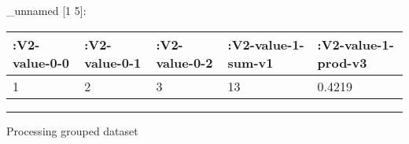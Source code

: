 \documentclass[]{article}
\newenvironment{Shaded}{\begin{snugshade}}{\end{snugshade}}
\newcommand{\KeywordTok}[1]{\textcolor[rgb]{0.13,0.29,0.53}{\textbf{#1}}}
\newcommand{\DecValTok}[1]{\textcolor[rgb]{0.00,0.00,0.81}{#1}}
\newcommand{\StringTok}[1]{\textcolor[rgb]{0.31,0.60,0.02}{#1}}
\newcommand{\VariableTok}[1]{\textcolor[rgb]{0.00,0.00,0.00}{#1}}
\newcommand{\AttributeTok}[1]{\textcolor[rgb]{0.77,0.63,0.00}{#1}}
\newcommand{\NormalTok}[1]{#1}
\begin{document}
\_unnamed {[}1 5{]}:

\begin{longtable}[]{@{}lllll@{}}
\toprule
\begin{minipage}[b]{0.15\columnwidth}\raggedright\strut
:V2-value-0-0\strut
\end{minipage} & \begin{minipage}[b]{0.15\columnwidth}\raggedright\strut
:V2-value-0-1\strut
\end{minipage} & \begin{minipage}[b]{0.15\columnwidth}\raggedright\strut
:V2-value-0-2\strut
\end{minipage} & \begin{minipage}[b]{0.20\columnwidth}\raggedright\strut
:V2-value-1-sum-v1\strut
\end{minipage} & \begin{minipage}[b]{0.21\columnwidth}\raggedright\strut
:V2-value-1-prod-v3\strut
\end{minipage}\tabularnewline
\midrule
\endhead
\begin{minipage}[t]{0.15\columnwidth}\raggedright\strut
1\strut
\end{minipage} & \begin{minipage}[t]{0.15\columnwidth}\raggedright\strut
2\strut
\end{minipage} & \begin{minipage}[t]{0.15\columnwidth}\raggedright\strut
3\strut
\end{minipage} & \begin{minipage}[t]{0.20\columnwidth}\raggedright\strut
13\strut
\end{minipage} & \begin{minipage}[t]{0.21\columnwidth}\raggedright\strut
0.4219\strut
\end{minipage}\tabularnewline
\bottomrule
\end{longtable}

\begin{center}\rule{0.5\linewidth}{0.5pt}\end{center}

Processing grouped dataset

\begin{Shaded}
\end{Shaded}
\end{document}
